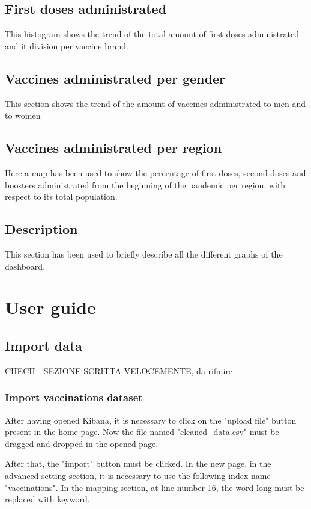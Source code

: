 \documentclass{article}
\begin{document}
\subsection{First doses administrated}
This histogram shows the trend of the total amount of first doses administrated and it division per vaccine brand.

\subsection{Vaccines administrated per gender}
This section shows the trend of the amount of vaccines administrated to men and to women 

\subsection{Vaccines administrated per region}
Here a map has been used to show the percentage of first doses, second doses and boosters administrated from the beginning of the pandemic per region, with respect to its total population.

\subsection{Description}
This section has been used to briefly describe all the different graphs of the dashboard.

\newpage

\section{User guide}

\subsection{Import data}
CHECH - SEZIONE SCRITTA VELOCEMENTE, da rifinire
\subsubsection{Import vaccinations dataset}
After having opened Kibana, it is necessary to click on the {\selectfont"upload file"} button present in the home page. Now the file named {\selectfont"cleaned\_data.csv"} must be dragged and dropped in the opened page.

After that, the {\selectfont"import"} button must be clicked. In the new page, in the advanced setting section, it is necessary to use the following index name {\selectfont"vaccinations"}. In the mapping section, at line number 16, the word long must be replaced with keyword.
\end{document}
